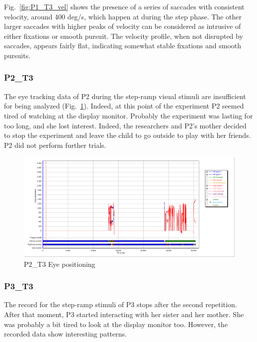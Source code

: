 Fig.~\ref{fig:P1_T3_vel} shows the presence of a series of saccades with consistent velocity, around 400 deg/s, which happen at during the step phase. The other larger saccades with higher peaks of velocity can be considered as intrusive of either fixations or smooth pursuit. The velocity profile, when not disrupted by saccades, appears fairly flat, indicating somewhat stable fixations and smooth pursuits. 



\subsubsection{P2\_T3}
\label{sec:P2_T3}

The eye tracking data of P2 during the step-ramp visual stimuli are insufficient for being analyzed (Fig.~\ref{fig:P2_T3_pos}). Indeed, at this point of the experiment P2 seemed tired of watching at the display monitor. Probably the experiment was lasting for too long, and she lost interest. Indeed, the researchers and P2’s mother decided to stop the experiment and leave the child to go outside to play with her friends. P2 did not perform further trials.

\begin{figure}[h]
  \centering
  \includegraphics[width=.8\textwidth]{figures/graphs/P2_T3(stepRamp)_XY.png}
  \caption[P2\_T3 Eye positioning]{P2\_T3 Eye positioning}
  \label{fig:P2_T3_pos}
\end{figure}



\subsubsection{P3\_T3}
\label{sec:P3_T3}

The record for the step-ramp stimuli of P3 stops after the second repetition. After that moment, P3 started interacting with her sister and her mother. She was probably a bit tired to look at the display monitor too. However, the recorded data show interesting patterns.

